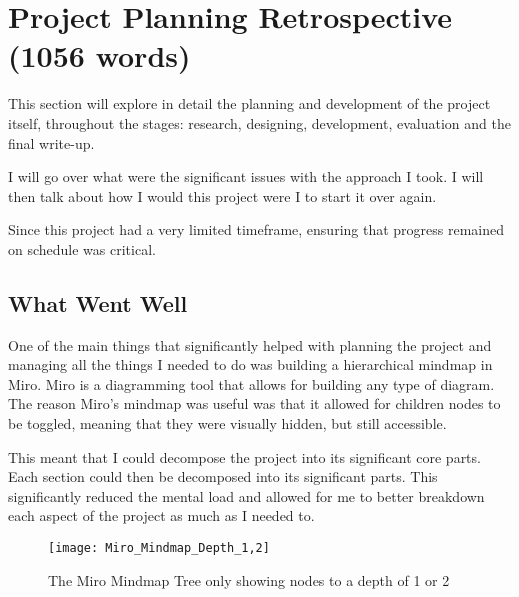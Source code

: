 \chapter{Project Planning Retrospective (1056 words)}
This section will explore in detail the planning and development of the project itself, throughout the stages: research, designing, development, evaluation and the final write-up.

I will go over what were the significant issues with the approach I took. I will then talk about how I would this project were I to start it over again.%

Since this project had a very limited timeframe, ensuring that progress remained on schedule was critical. %

\section{What Went Well}
One of the main things that significantly helped with planning the project and managing all the things I needed to do was building a hierarchical mindmap in Miro. Miro is a diagramming tool that allows for building any type of diagram. The reason Miro's mindmap was useful was that it allowed for children nodes to be toggled, meaning that they were visually hidden, but still accessible.

This meant that I could decompose the project into its significant core parts. Each section could then be decomposed into its significant parts. This significantly reduced the mental load and allowed for me to better breakdown each aspect of the project as much as I needed to.
\begin{figure}
    \texttt{[image: Miro\_Mindmap\_Depth\_1,2]}
    \caption{The Miro Mindmap Tree only showing nodes to a depth of 1 or 2}
\end{figure}


